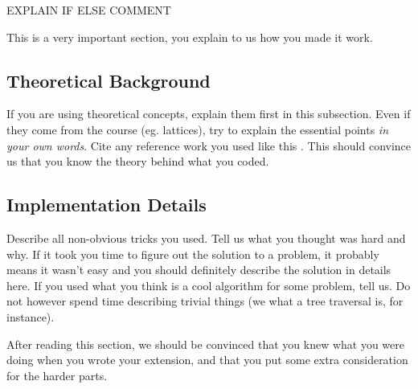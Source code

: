 EXPLAIN IF ELSE COMMENT

This is a very important section, you explain to us how you made it work.

\subsection{Theoretical Background}
If you are using theoretical concepts, explain them first in this subsection.
Even if they come from the course (eg. lattices), try to explain the essential
points \emph{in your own words}. Cite any reference work you used like this
\cite{TigerBook}. This should convince us that you know the theory behind what
you coded. 

\subsection{Implementation Details}
Describe all non-obvious tricks you used. Tell us what you thought was hard and
why. If it took you time to figure out the solution to a problem, it probably
means it wasn't easy and you should definitely describe the solution in details
here. If you used what you think is a cool algorithm for some problem, tell us.
Do not however spend time describing trivial things (we what a tree traversal
is, for instance). 

After reading this section, we should be convinced that you knew what you were
doing when you wrote your extension, and that you put some extra consideration
for the harder parts.
